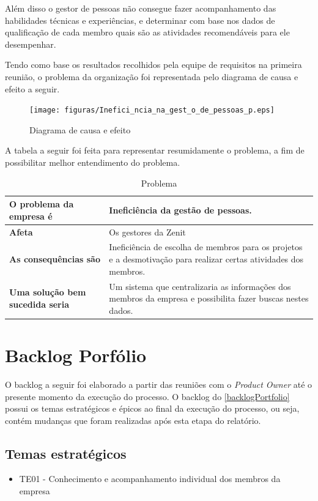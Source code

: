 Além disso o gestor de pessoas não consegue fazer acompanhamento das habilidades técnicas e experiências, e determinar com base nos dados de qualificação de cada membro quais são as atividades recomendáveis para ele desempenhar.

Tendo como base os resultados recolhidos pela equipe de requisitos na primeira reunião, o problema da organização foi representada pelo  diagrama de causa e efeito a seguir.

\begin{figure}[H]
    \centering
    \texttt{[image: figuras/Inefici\_ncia\_na\_gest\_o\_de\_pessoas\_p.eps]}
    \caption[Diagrama de causa e efeito]{Diagrama de causa e efeito\label{fishBone}}
\end{figure}

A tabela a seguir foi feita para representar resumidamente o problema, a fim de possibilitar melhor entendimento do problema.

\begin{table}[H]
    \centering
    \label{descricaoAtividades}
    \caption{Problema}
        \begin{tabular}{|l|p{10cm}|}
        \hline
        \textbf{O problema da empresa é} &Ineficiência da gestão de pessoas.\\
        \hline
        \textbf{Afeta} &Os gestores da Zenit\\
        \hline
        \textbf{As consequências são} &Ineficiência de escolha de membros para os projetos e a desmotivação para realizar certas atividades dos membros.\\
        \hline
        \textbf{Uma solução bem sucedida seria} &Um sistema que centralizaria as informações dos membros da empresa e possibilita fazer buscas nestes dados.\\
        \hline
    \end{tabular}
\end{table}

\section{Backlog Porfólio}
O backlog a seguir foi elaborado a partir das reuniões com o \textit{Product Owner} até o presente momento da execução do processo. O backlog do \ref{backlogPortfolio} possui os temas estratégicos e épicos ao final da execução do processo, ou seja, contém mudanças que foram realizadas após esta etapa do relatório.


\subsection{Temas estratégicos}
\label{temasEstrategicos}
\begin{itemize}
\item {TE01 - Conhecimento e acompanhamento individual dos membros da empresa}
\end{itemize}

